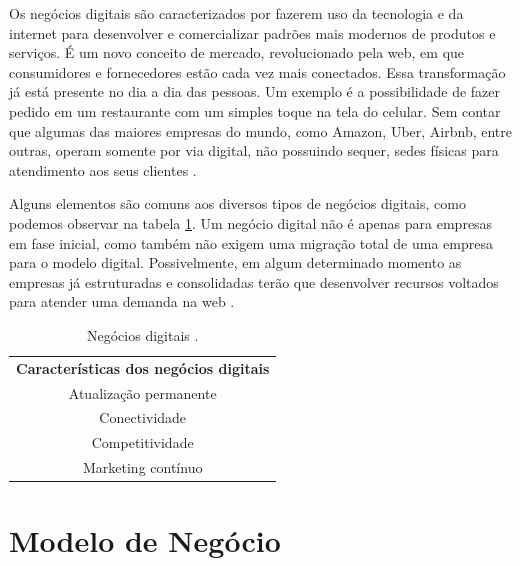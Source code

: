 Os negócios digitais são caracterizados por fazerem uso da tecnologia e da internet para desenvolver e comercializar padrões mais modernos de produtos e serviços. É um novo conceito de mercado, revolucionado pela web, em que consumidores e fornecedores estão cada vez mais conectados. Essa transformação já está presente no dia a dia das pessoas. Um exemplo é a possibilidade de fazer pedido em um restaurante com um simples toque na tela do celular. Sem contar que algumas das maiores empresas do mundo, como Amazon, Uber, Airbnb, entre outras, operam somente por via digital, não possuindo sequer, sedes físicas para atendimento aos seus clientes \cite{negdig2018}.

Alguns  elementos  são  comuns  aos  diversos  tipos  de  negócios  digitais,  como podemos observar na tabela \ref{tab:negdigital}. Um negócio digital não é apenas para empresas em fase inicial, como também não exigem uma migração total de uma empresa para o modelo digital. Possivelmente, em algum determinado momento as empresas já estruturadas e consolidadas terão que desenvolver recursos voltados para atender uma demanda na web \cite{negdig2018}.

\begin{table}[H]
 \centering
 {\renewcommand\arraystretch{1.25}
 
 \caption{Negócios digitais \cite{negdig2018}. }
 \label{tab:negdigital}
 
 \begin{tabular}{ l }
  \cline{1-1}  
    \multicolumn{1}{|c|}{\textbf{Características dos negócios digitais} \centering }
  \\  
  \cline{1-1}  
    \multicolumn{1}{|c|}{Atualização permanente \centering }
  \\  
  \cline{1-1}  
    \multicolumn{1}{|c|}{Conectividade \centering }
  \\  
  \cline{1-1}  
    \multicolumn{1}{|c|}{Competitividade \centering }
  \\  
  \cline{1-1}  
    \multicolumn{1}{|c|}{Marketing contínuo \centering }
  \\  
  \hline

 \end{tabular} }
\end{table}

\section{Modelo de Negócio}
\label{sec:model}

